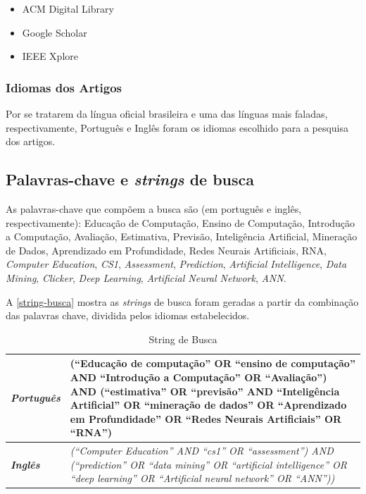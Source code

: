 \documentclass[
	12pt,				%
	openright,			%
	oneside,
	a4paper,			%
	english,			%
	french,				%
	spanish,			%
	brazil,				%
	]{abntex2}
\begin{document}
\begin{itemize}
    \item ACM Digital Library
    \item Google Scholar
    \item IEEE Xplore
\end{itemize}

\subsubsection{Idiomas dos Artigos}
Por se tratarem da língua oficial brasileira e uma das línguas mais faladas, respectivamente, Português e Inglês foram os idiomas escolhido para a pesquisa dos artigos.

\subsection{Palavras-chave e \textit{strings} de busca}

As palavras-chave que compõem a busca são (em português e inglês, respectivamente): 
Educação de Computação, Ensino de Computação, Introdução a Computação, Avaliação, Estimativa, Previsão, Inteligência Artificial, Mineração de Dados, Aprendizado em Profundidade, Redes Neurais Artificiais, RNA, \textit{Computer Education}, \textit{CS1}, \textit{Assessment}, \textit{Prediction}, \textit{Artificial Intelligence}, \textit{Data Mining}, \textit{Clicker}, \textit{Deep Learning}, \textit{Artificial Neural Network}, \textit{ANN}.

A \autoref{string-busca} mostra as \textit{strings} de busca foram geradas a partir da combinação das palavras chave, dividida pelos idiomas estabelecidos.

\begin{center}
\begin{longtable}{|| p{3cm} || p{10cm} ||}
\caption{String de Busca}
\label{string-busca}
\hline
\textit{\textbf{Português}} & (``Educação de computação'' OR ``ensino de computação'' AND ``Introdução a Computação'' OR ``Avaliação'') AND (``estimativa'' OR ``previsão'' AND ``Inteligência Artificial'' OR ``mineração de dados'' OR ``Aprendizado em Profundidade'' OR ``Redes Neurais Artificiais'' OR ``RNA'')\\
\hline \hline
\textit{\textbf{Inglês}} & \textit{(``Computer Education'' AND ``cs1'' OR ``assessment'') AND (``prediction'' OR ``data mining'' OR ``artificial intelligence'' OR ``deep learning'' OR ``Artificial neural network'' OR ``ANN''))}\\
 \hline \hline
\end{longtable}
\end{center}
\end{document}

